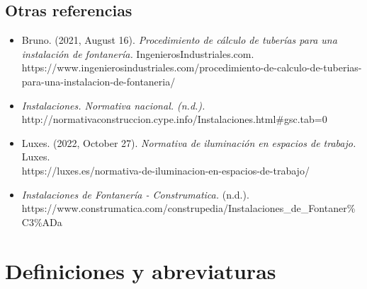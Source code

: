 \documentclass[../main.tex]{subfiles}
\begin{document}
\subsection{Otras referencias}
\begin{itemize}
    \item Bruno. (2021, August 16). \textit{Procedimiento de cálculo de tuberías para una instalación de fontanería.} IngenierosIndustriales.com. https://www.ingenierosindustriales.com/procedimiento-de-calculo-de-tuberias-para-una-instalacion-de-fontaneria/
    \item \textit{Instalaciones. Normativa nacional. (n.d.).} \\ http://normativaconstruccion.cype.info/Instalaciones.html\#gsc.tab=0
    \item Luxes. (2022, October 27). \textit{Normativa de iluminación en espacios de trabajo.} Luxes. \\ https://luxes.es/normativa-de-iluminacion-en-espacios-de-trabajo/
    \item \textit{Instalaciones de Fontanería - Construmatica.} (n.d.). \\ https://www.construmatica.com/construpedia/Instalaciones\_de\_Fontaner\%C3\%ADa
\end{itemize}
\section{Definiciones y abreviaturas}
\end{document}
